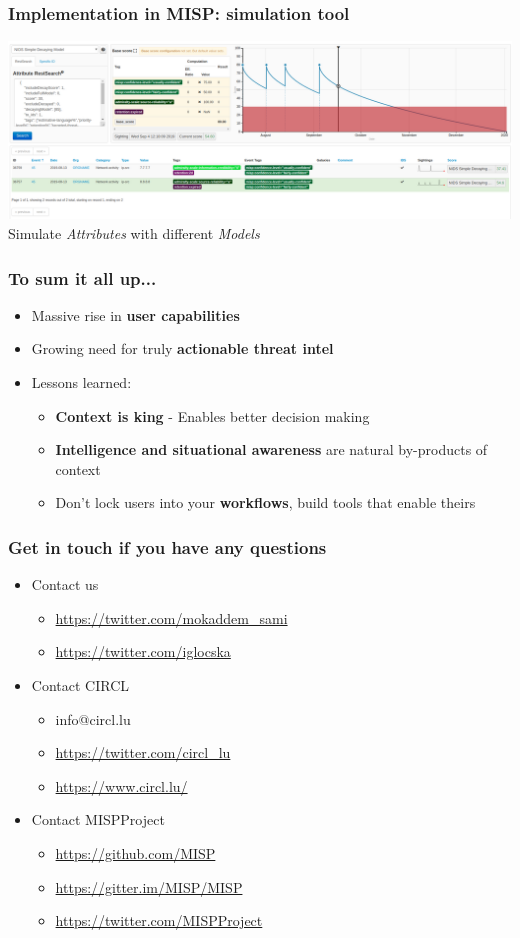 \begin{frame}
    \frametitle{Implementation in MISP: simulation tool}
    \includegraphics[width=1.00\linewidth]{decaying-simulation.png}
    Simulate \textit{Attributes} with different \textit{Models}
\end{frame}

\begin{frame}
  \frametitle{To sum it all up...}
  \begin{itemize}
     \item Massive rise in {\bf user capabilities}
     \item Growing need for truly {\bf actionable threat intel}
     \item Lessons learned:
     \begin{itemize}
	\item {\bf Context is king} - Enables better decision making
        \item {\bf Intelligence and situational awareness} are natural by-products of context
        \item Don't lock users into your {\bf workflows}, build tools that enable theirs
     \end{itemize}
  \end{itemize}
\end{frame}

\begin{frame}
  \frametitle{Get in touch if you have any questions}
  \begin{itemize}
    \item Contact us
    \begin{itemize}
      \item \url{https://twitter.com/mokaddem_sami}
      \item \url{https://twitter.com/iglocska}
    \end{itemize}
    \item Contact CIRCL
    \begin{itemize}
      \item info@circl.lu
      \item \url{https://twitter.com/circl_lu}
      \item \url{https://www.circl.lu/}
    \end{itemize}
    \item Contact MISPProject 
    \begin{itemize}
      \item \url{https://github.com/MISP}
      \item \url{https://gitter.im/MISP/MISP}
      \item \url{https://twitter.com/MISPProject}
    \end{itemize}
  \end{itemize}
\end{frame}
